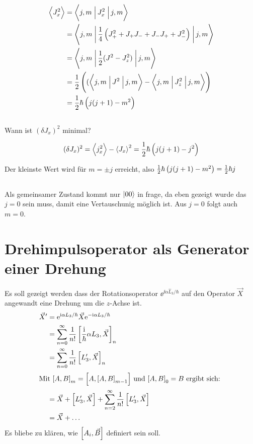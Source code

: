 \begin{align*}
    \mw{J_x^2} &= \braopket{j,m}{J_x^2}{j,m} \\
               &= \braopket{j,m}{\frac 14 \del{J_+^2+J_+J_-+J_-J_++J_-^2}}{j,m} \\
    &= \braopket{j,m}{\frac 12(J^2-J_z^2)}{j,m} \\
    &= \frac 12 \del{(\braopket{j,m}{J^2}{j,m} - \braopket{j,m}{J_z^2}{j,m}} \\
    &= \frac 12\hbar \del{j(j+1)-m^2}
\end{align*}

\subsection{}
Wann ist $(\delta J_x)^2$ minimal?

\[
    (\delta J_x)^2 = \mw{j_x^2}-\mw{J_x}^2 = \frac 12\hbar \del{j(j+1)-j^2}
\]

Der kleinste Wert wird für $m = \pm j$ erreicht, also $ \frac 12\hbar \del{j(j+1)-m^2}=\frac 12\hbar j$

\subsection{}
Als gemeinsamer Zustand kommt nur $\left|00\right\rangle$ in frage, da eben gezeigt wurde das $j=0$ sein muss, damit eine Vertauschunig möglich ist. Aus $j=0$ folgt auch $m=0$.

\section{Drehimpulsoperator als Generator einer Drehung}

Es soll gezeigt werden dass der Rotationsoperator $\ee^{\ii\alpha\hat L_3 / \hbar}$ auf den Operator $\vec X$ angewandt eine Drehung um die $z$-Achse ist.
\begin{align*}
 \vec X' &= \ee^{\ii\alpha L_3 /\hbar} \vec X \ee^{-\ii\alpha L_3 /\hbar}\\
 &= \sum_{n=0}^\infty \frac1{n!} \sbr{\frac{\ii}{\hbar} \alpha L_3, \vec X}_n\\
 &= \sum_{n=0}^\infty \frac1{n!} \sbr{L'_3, \vec X}_n\\
 \intertext{%
  Mit $\sbr{A,B}_m = \sbr{A, \sbr{A,B}_{m-1}}$ und $\sbr{A,B}_0 = B$ ergibt sich:
  }
 &= \vec X + \sbr{L'_3, \vec X} + \sum_{n=2}^\infty \frac1{n!} \sbr{L'_3, \vec X}\\
 &= \vec X + \ldots
\end{align*}
Es bliebe zu klären, wie $\sbr{A_i,\vec B}$ definiert sein soll.


